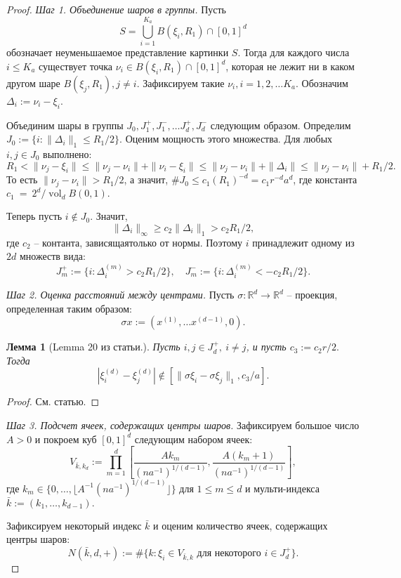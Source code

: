 \documentclass[12pt]{article}
\theoremstyle{plain}
\newtheorem{lm}{Лемма}
\theoremstyle{definition}
\theoremstyle{remark}
\def\geq{\geqslant}
\def\leq{\leqslant}
\DeclareMathOperator{\vol}{vol}
\newcommand{\R}{\mathbb{R}}
\begin{document}
\begin{proof}
{\it Шаг 1. Объединение шаров в группы.} Пусть $$S = \bigcup_{i=1}^{K_a} B(\xi_i, R_1) \cap [0,1]^d$$ обозначает неуменьшаемое представление картинки $S$. Тогда для каждого числа $i\leq K_a$ существует точка $\nu_i\in B(\xi_i, R_1) \cap [0,1]^d$, которая не лежит ни в каком другом шаре $B(\xi_j, R_1), j \not= i$. Зафиксируем такие $\nu_i, i = 1, 2, \ldots K_a$. Обозначим $\Delta_i := \nu_i - \xi_i$.

Объединим шары в группы $J_0, J_1^+, J_1^-, \ldots J_d^+, J_d^-$ следующим образом. Определим $J_0 := \{i \colon \|\Delta_i\|_1 \leq R_1/2\}$. Оценим мощность этого множества. Для любых $i, j \in J_0$ выполнено:
$$R_1 < \|\nu_j - \xi_i\| \leq \|\nu_j - \nu_i\| + \|\nu_i - \xi_i\| \leq 
\|\nu_j - \nu_i\| + \|\Delta_i\| \leq \|\nu_j - \nu_i\| + R_1/2.$$
То есть $\|\nu_j-\nu_i\|> R_1/2$, а значит, $\#J_0 \leq c_1(R_1)^{-d} = c_1r^{-d}a^d$, где константа $c_1~=~2^d/\vol_d B(0,1).$

Теперь пусть $i\not\in J_0$. Значит, $$\|\Delta_i\|_\infty \geq c_2\|\Delta_i\|_1 > c_2R_1/2,$$ где $c_2$ -- контанта, зависящаятолько от нормы. Поэтому $i$ принадлежит одному из $2d$ множеств вида: $$J_m^+ := \{i\colon \Delta_i^{(m)} > c_2R_1/2\}, \quad J_m^- := \{i\colon \Delta_i^{(m)} < - c_2R_1/2\}.$$

{\it Шаг 2. Оценка расстояний между центрами.} Пусть $\sigma \colon \R^d \to \R^d$ -- проекция, определенная таким образом: $$\sigma x := (x^{(1)}, \ldots x^{(d-1)}, 0).$$ 

\begin{lm}[Lemma 20 из статьи.]
Пусть $i, j\in J_d^+, \ i\not= j$, и пусть $c_3 := c_2 r/2.$ Тогда $$|\xi_i^{(d)} - \xi_j^{(d)}| \not\in [\|\sigma\xi_i - \sigma\xi_j\|_1, c_3/a].$$
\end{lm}{}
\begin{proof}
См. статью.
\end{proof}{}

{\it Шаг 3. Подсчет ячеек, содержащих центры шаров.} 
Зафиксируем большое число $A > 0$ и покроем куб $[0, 1]^d$ следующим набором ячеек: $$V_{\bar k, k_d} := \prod_{m = 1}^d\left[\dfrac{Ak_m}{(na^{-1})^{1/(d-1)}}, \dfrac{A(k_m+1)}{(na^{-1})^{1/(d-1)}}\right],$$
где $k_m\in \{0, \ldots, \lfloor A^{-1}(na^{-1})^{1/(d-1)}\rfloor\}$ для $1\leq m \leq d$ и мульти-индекса $\bar k := (k_1, \ldots, k_{d-1}).$

Зафиксируем некоторый индекс $\bar k$ и оценим количество ячеек, содержащих центры шаров: $$N(\bar k, d, +):= \#\{k\colon \xi_i\in V_{\bar k, k} \text{ для некоторого } i\in J_d^+\}.$$


\end{proof}
\end{document}
